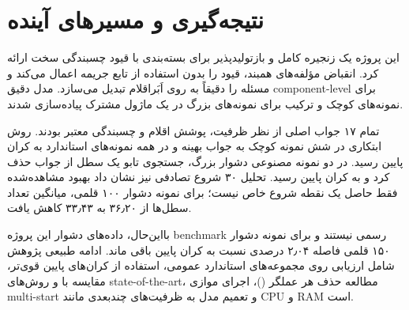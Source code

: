 \section{نتیجه‌گیری و مسیرهای آینده}
این پروژه یک زنجیره کامل و بازتولیدپذیر برای بسته‌بندی با قیود چسبندگی سخت
ارائه کرد. انقباض مؤلفه‌های همبند، قیود  را بدون استفاده از تابع
جریمه اعمال می‌کند و مسئله را دقیقاً به  روی اَبَراقلام تبدیل می‌سازد.
مدل دقیق component-level برای نمونه‌های کوچک و ترکیب  برای
نمونه‌های بزرگ در یک ماژول مشترک پیاده‌سازی شدند.

تمام ۱۷ جواب اصلی از نظر ظرفیت، پوشش اقلام و چسبندگی معتبر بودند. روش ابتکاری
در شش نمونه کوچک به جواب بهینه  و در همه نمونه‌های استاندارد به کران
پایین رسید. در دو نمونه مصنوعی دشوار بزرگ، جستجوی تابو یک سطل از جواب 
حذف کرد و به کران پایین رسید. تحلیل ۳۰ شروع تصادفی نیز نشان داد بهبود مشاهده‌شده
فقط حاصل یک نقطه شروع خاص نیست؛ برای نمونه دشوار ۱۰۰ قلمی، میانگین تعداد سطل‌ها
از ۳۶٫۲۰ به ۳۳٫۴۳ کاهش یافت.

بااین‌حال، داده‌های دشوار این پروژه benchmark رسمی نیستند و برای نمونه دشوار
۱۵۰ قلمی فاصله ۲٫۰۴ درصدی نسبت به کران پایین باقی ماند. ادامه طبیعی پژوهش شامل
ارزیابی روی مجموعه‌های استاندارد عمومی، استفاده از کران‌های پایین قوی‌تر،
مقایسه با  و روش‌های state-of-the-art، مطالعه حذف هر
عملگر ()، اجرای موازی multi-start و تعمیم مدل به ظرفیت‌های
چندبعدی مانند CPU و RAM است.
